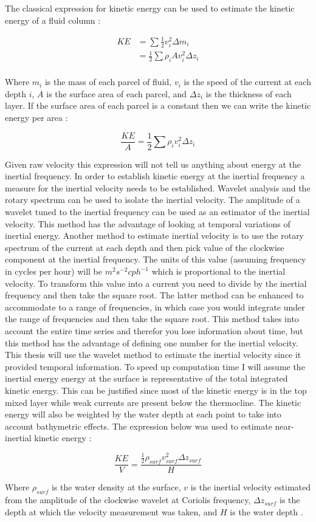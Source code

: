 The classical expression for kinetic energy can be used to estimate the kinetic energy of a fluid column : 

\begin{align*}
	KE &=\sum \frac{1}{2} v_i^2 \Delta m_i \\ 
	&= \frac{1}{2} \sum \rho_i A v_i^2 \Delta z_i  \\
\end{align*}

Where $m_i$ is the mass of each parcel of fluid, $v_i$ is the speed of the current at each depth $i$, $A$ is the surface area of each parcel, and $\Delta z_i$ is the thickness of 
each layer. If the surface area of each parcel is a constant then we can write the kinetic energy per area : 

$$ \frac{KE}{A} =  \frac{1}{2} \sum \rho_i v_i^2 \Delta z_i $$

Given raw velocity this expression will not tell us anything about energy at the inertial frequency. In order to establish kinetic energy at the inertial frequency a
measure for the inertial velocity needs to be established. Wavelet analysis and the rotary spectrum can be used to isolate the inertial velocity. The amplitude 
of a wavelet tuned to the inertial frequency can be used as an estimator of the inertial velocity. This method has the advantage of looking at temporal variations
of inertial energy. Another method to estimate inertial velocity is to use the rotary spectrum of the current at each depth and then pick value of the clockwise 
component at the inertial frequency. The units of this value (assuming frequency in cycles per hour) will be $m^2 s^{-2} cph^{-1}$ which is proportional to the 
inertial velocity. To transform this value into a current you need to divide by the inertial frequency and then take the square root. The latter method can be enhanced to accommodate
to a range of frequencies, in which case you would integrate under the range of frequencies and then take the square root. This method takes into account the 
entire time series and therefor you lose information about time, but this method has the advantage of defining one number for the inertial velocity. 
This thesis will use the wavelet method to estimate the inertial velocity since it provided temporal information. To speed up computation time I will assume the inertial energy
energy at the surface is representative of the total integrated kinetic energy. This can be justified since most of the kinetic energy is in the top mixed layer while weak currents
are present below the thermocline. The kinetic energy will also be weighted by the water depth at each point to take into account bathymetric effects. The expression below
was used to estimate near-inertial kinetic energy : 

$$\frac{KE}{V}=\frac{\frac{1}{2}\rho_{surf} v^2_{surf} \Delta z_{surf}}{H} $$

Where $\rho_{surf}$ is the water density at the surface, $v$ is the inertial velocity estimated from the amplitude of the clockwise wavelet at Coriolis frequency, $\Delta z_{surf}$ is the
depth at which the velocity measurement was taken, and $H$ is the water depth . 

